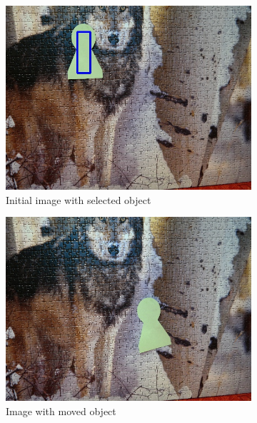 \begin{figure}
  \centering
  \begin{subfigure}[b]{0.48\linewidth}
    \includegraphics[width=\linewidth]{img/hsv/initial.jpg}
    \caption{Initial image with selected object}
  \end{subfigure}
  \begin{subfigure}[b]{0.48\linewidth}
    \includegraphics[width=\linewidth]{img/hsv/object.jpg}
    \caption{Image with moved object}
  \end{subfigure}
  \begin{subfigure}[b]{0.48\linewidth}

\end{subfigure}
\end{figure}

